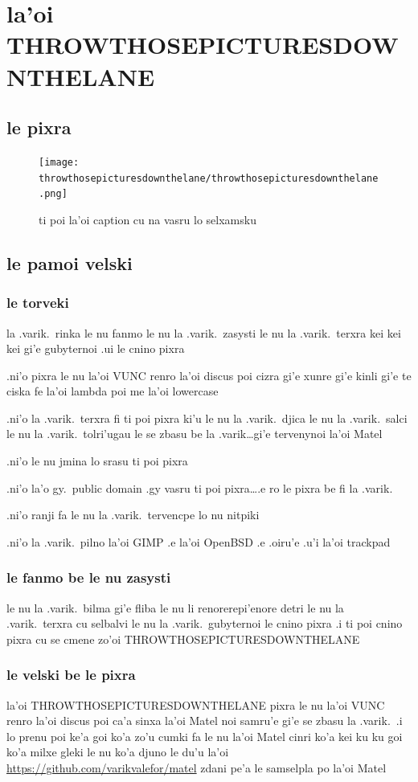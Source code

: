 \documentclass{report}
\begin{document}
\chapter{la'oi THROWTHOSEPICTURESDOWNTHELANE}
\section{le pixra}
\begin{figure}[ht]
	\centering
	\texttt{[image: throwthosepicturesdownthelane/throwthosepicturesdownthelane.png]}
	\caption[center]{ti poi la'oi caption cu na vasru lo selxamsku}
\end{figure}
\section{le pamoi velski}
\subsection{le torveki}
la .varik.\ rinka le nu fanmo le nu la .varik.\ zasysti le nu la .varik.\ terxra kei kei kei gi'e gubyternoi .ui le cnino pixra

.ni'o pixra le nu la'oi VUNC renro la'oi discus poi cizra gi'e xunre gi'e kinli gi'e te ciska fe la'oi lambda poi me la'oi lowercase

.ni'o la .varik.\ terxra fi ti poi pixra ki'u le nu la .varik.\ djica le nu la .varik.\ salci le nu la .varik.\ tolri'ugau le se zbasu be la .varik\ldots gi'e tervenynoi la'oi Matel

.ni'o le nu jmina lo srasu ti poi pixra

.ni'o la'o gy.\ public domain .gy vasru ti poi pixra\ldots .e ro le pixra be fi la .varik.

.ni'o ranji fa le nu la .varik.\ tervencpe lo nu nitpiki

.ni'o la .varik.\ pilno la'oi GIMP .e la'oi OpenBSD .e .oiru'e .u'i la'oi trackpad

\subsection{le fanmo be le nu zasysti}
le nu la .varik.\ bilma gi'e fliba le nu li renorerepi'enore detri le nu la .varik.\ terxra cu selbalvi le nu la .varik.\ gubyternoi le cnino pixra  .i ti poi cnino pixra cu se cmene zo'oi THROWTHOSEPICTURESDOWNTHELANE

\subsection{le velski be le pixra}
la'oi THROWTHOSEPICTURESDOWNTHELANE pixra le nu la'oi VUNC renro la'oi discus poi ca'a sinxa la'oi Matel noi samru'e gi'e se zbasu la .varik.\  .i lo prenu poi ke'a goi ko'a zo'u cumki fa le nu la'oi Matel cinri ko'a kei ku ku goi ko'a milxe gleki le nu ko'a djuno le du'u la'oi \url{https://github.com/varikvalefor/matel} zdani pe'a le samselpla po la'oi Matel
\end{document}
